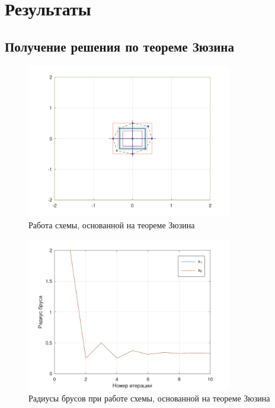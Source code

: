 \section{Результаты}
\subsection{Получение решения по теореме Зюзина}
\begin{figure}[H]
\centering
\includegraphics[width=0.8\textwidth]{Graphics/Decomp_boxes.png}
\caption{Работа схемы, основанной на теореме Зюзина} 
\end{figure}
\begin{figure}[H]\label{ZuzRad}
\centering
\includegraphics[width=0.8\textwidth]{Graphics/Decomp_radius.png}
\caption{Радиусы брусов при работе схемы, основанной на теореме Зюзина} 
\end{figure}
